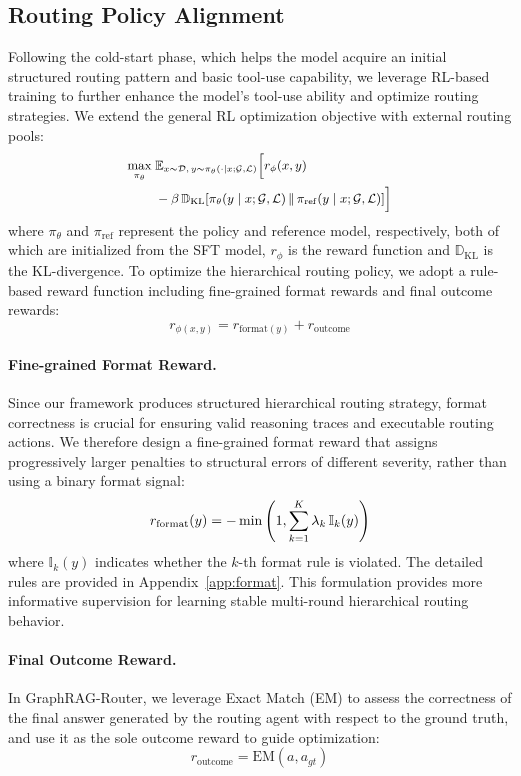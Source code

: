 \subsection{Routing Policy Alignment}
\label{sec:stage1}
Following the cold-start phase, which helps the model acquire an initial structured routing pattern and basic tool-use capability, we leverage RL-based training to further enhance the model's tool-use ability and optimize routing strategies. We extend the general RL optimization objective with external routing pools:
\[
\small
\begin{aligned}
\max_{\pi_\theta}\;&\mathbb{E}_{x\sim\mathcal{D},\,y\sim\pi_\theta(\cdot\mid x;\mathcal{G},\mathcal{L})}
\Bigl[r_\phi(x,y) \\
&-\beta \,\mathbb{D}_{\mathrm{KL}}\!\left[
\pi_\theta(y\mid x;\mathcal{G},\mathcal{L}) \,\middle\|\, \pi_{\mathrm{ref}}(y\mid x;\mathcal{G},\mathcal{L})
\right]\Bigr]
\end{aligned}
\]
where $\pi_\theta$ and $\pi_{\mathrm{ref}}$ represent the policy and reference model, respectively, both of which are initialized from the SFT model, $r_\phi$ is the reward function and $\mathbb{D}_{\mathrm{KL}}$ is the KL-divergence. To optimize the hierarchical routing policy, we adopt a rule-based reward function including fine-grained format rewards and final outcome rewards:
\[
r_{\phi(x,y)} = r_{\mathrm{format}(y)} + r_{\mathrm{outcome}}
\]
\paragraph{Fine-grained Format Reward.} Since our framework produces structured hierarchical routing strategy, format correctness is crucial for ensuring valid reasoning traces and executable routing actions. We therefore design a fine-grained format reward that assigns progressively larger penalties to structural errors of different severity, rather than using a binary format signal:
\[
\small
r_{\mathrm{format}}(y)
=
-\min\left(1,\sum_{k=1}^{K}\lambda_k \,\mathbb{I}_k(y)\right)
\]
where $\mathbb{I}_k(y)$ indicates whether the $k$-th format rule is violated. The detailed rules are provided in Appendix~\ref{app:format}. This formulation provides more informative supervision for learning stable multi-round hierarchical routing behavior.\\
\paragraph{Final Outcome Reward.}
In GraphRAG-Router, we leverage Exact Match (EM) to assess the correctness of the final answer generated by the routing agent with respect to the ground truth, and use it as the sole outcome reward to guide optimization:
\[
r_{\mathrm{outcome}} = \mathrm{EM}(a, a_{gt})
\]
